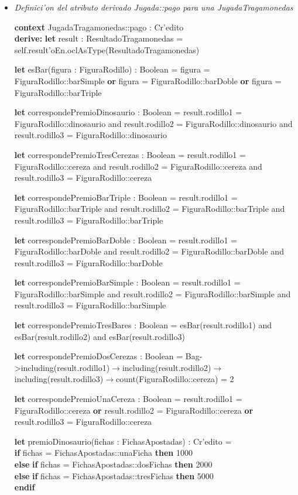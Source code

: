 \begin{itemize}
\item \textit{Definici'on del atributo derivado Jugada::pago para una JugadaTragamonedas}

\textbf{context} JugadaTragamonedas::pago : Cr'edito \\ \textbf{derive:}
    \textbf{let} result : ResultadoTragamonedas = self.result'oEn.oclAsType(ResultadoTragamonedas)

    \textbf{let} esBar(figura : FiguraRodillo) : Boolean = figura = FiguraRodillo::barSimple \textbf{or} figura = FiguraRodillo::barDoble \textbf{or} figura = FiguraRodillo::barTriple

    \textbf{let} correspondePremioDinosaurio : Boolean = result.rodillo1 = FiguraRodillo::dinosaurio and result.rodillo2 = FiguraRodillo::dinosaurio and result.rodillo3 = FiguraRodillo::dinosaurio
    
    \textbf{let} correspondePremioTresCerezas : Boolean = result.rodillo1 = FiguraRodillo::cereza and result.rodillo2 = FiguraRodillo::cereza and result.rodillo3 = FiguraRodillo::cereza
    
    \textbf{let} correspondePremioBarTriple : Boolean = result.rodillo1 = FiguraRodillo::barTriple and result.rodillo2 = FiguraRodillo::barTriple and result.rodillo3 = FiguraRodillo::barTriple
    
    \textbf{let} correspondePremioBarDoble : Boolean = result.rodillo1 = FiguraRodillo::barDoble and result.rodillo2 = FiguraRodillo::barDoble and result.rodillo3 = FiguraRodillo::barDoble
    
    \textbf{let} correspondePremioBarSimple : Boolean = result.rodillo1 = FiguraRodillo::barSimple and result.rodillo2 = FiguraRodillo::barSimple and result.rodillo3 = FiguraRodillo::barSimple
    
    \textbf{let} correspondePremioTresBares : Boolean = esBar(result.rodillo1) and esBar(result.rodillo2) and esBar(result.rodillo3)
    
    \textbf{let} correspondePremioDosCerezas : Boolean = Bag{}->including(result.rodillo1)$\rightarrow$including(result.rodillo2)$\rightarrow$including(result.rodillo3)$\rightarrow$count(FiguraRodillo::cereza) = 2
    
    \textbf{let} correspondePremioUnaCereza : Boolean = result.rodillo1 = FiguraRodillo::cereza \textbf{or} result.rodillo2 = FiguraRodillo::cereza \textbf{or} result.rodillo3 = FiguraRodillo::cereza

    \textbf{let} premioDinosaurio(fichas : FichasApostadas) : Cr'edito =\\
        \textbf{if} fichas = FichasApostadas::unaFicha \textbf{then} 1000\\
        \textbf{else} \textbf{if} fichas = FichasApostadas::dosFichas \textbf{then} 2000\\
        \textbf{else} \textbf{if} fichas = FichasApostadas::tresFichas \textbf{then} 5000\\
        \textbf{endif}


\end{itemize}
